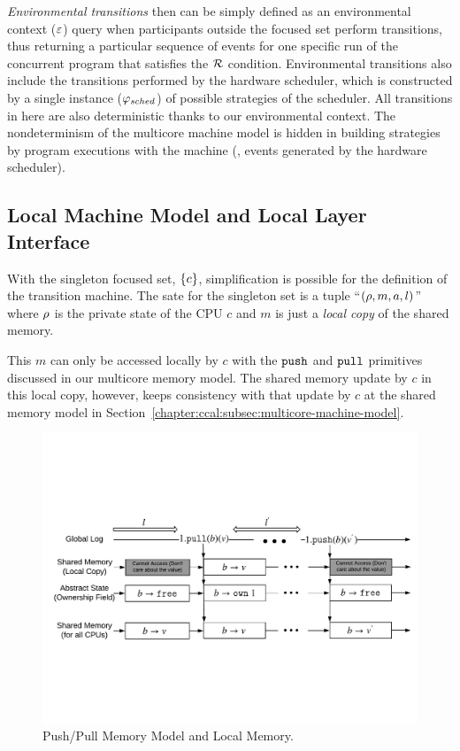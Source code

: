\emph{Environmental transitions} then can be simply defined as 
an environmental context (${\varepsilon}$) query when participants outside  the focused set perform transitions,
thus returning a particular sequence of events for one specific run of the concurrent program 
that satisfies the $\mathcal{R}$ condition.
Environmental transitions also include the transitions performed by 
the hardware scheduler, which is constructed by 
a single instance ($\varphi_{sched}$) of possible strategies of the scheduler.
All transitions in here are also deterministic thanks to our environmental context.
The nondeterminism of the multicore machine model is hidden in building strategies by
program executions with the machine (\eg, events generated by the hardware scheduler).

\subsection{Local Machine Model and Local Layer Interface}
\label{chapter:ccal:subsec:local-layer-interface}

With the singleton focused set, $\{c\}$, 
simplification is possible for the definition of the transition machine.
The sate for the singleton set is a tuple ``$(\rho, m, a, l)$''
where $\rho$ is the private state of the CPU $c$
and $m$ is just a \emph{local copy} of the shared memory.


This $m$ can only be accessed locally by $c$ with the ${\mathrm{\texttt{push}}}$ and ${\mathrm{\texttt{pull}}}$ primitives discussed in our multicore memory model. 
The shared  memory update by $c$ in this local copy, however, 
keeps consistency with 
that update by $c$ at the shared memory model in
Section~\ref{chapter:ccal:subsec:multicore-machine-model}.



\begin{figure}
\includegraphics[width=\textwidth]{figs/ccal/pushpullsharedmemorylocal}
\caption{Push/Pull Memory Model and Local Memory.}
\label{fig:chapter:ccal:push-pull-memory-model-and-local-memory}
\end{figure}

